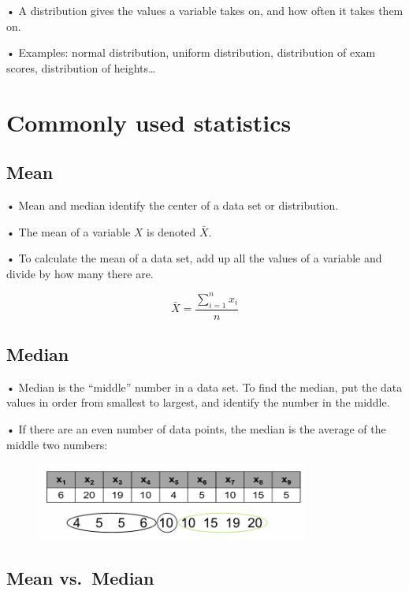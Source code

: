 \documentclass[
  letterpaper,
  DIV=11,
  numbers=noendperiod]{scrreprt}
\begin{document}
• A distribution gives the values a variable takes on, and how often it
takes them on.

• Examples: normal distribution, uniform distribution, distribution of
exam scores, distribution of heights\ldots{}

\hypertarget{commonly-used-statistics}{%
\section{Commonly used statistics}\label{commonly-used-statistics}}

\hypertarget{mean}{%
\subsection{Mean}\label{mean}}

• Mean and median identify the center of a data set or distribution.

• The mean of a variable \(X\) is denoted \(\bar{X}\).

• To calculate the mean of a data set, add up all the values of a
variable and divide by how many there are.

\[
\bar{X} = \frac{\sum^n_{i=1}x_i}{n}
\]

\hypertarget{median}{%
\subsection{Median}\label{median}}

• Median is the ``middle'' number in a data set. To find the median, put
the data values in order from smallest to largest, and identify the
number in the middle.

• If there are an even number of data points, the median is the average
of the middle two numbers:

\begin{figure}

{\centering \includegraphics[width=3.52083in,height=\textheight]{images/Mod1_1.png}

}

\end{figure}

\hypertarget{mean-vs.-median}{%
\subsection{Mean vs.~Median}\label{mean-vs.-median}}
\end{document}
